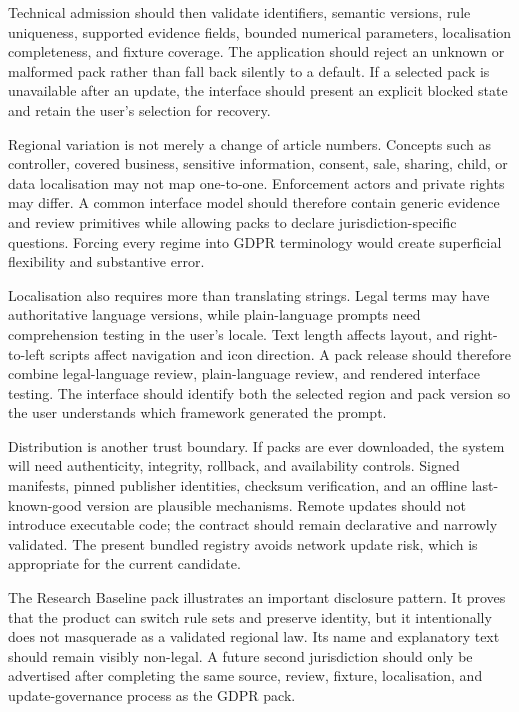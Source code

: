 Technical admission should then validate identifiers, semantic versions, rule uniqueness, supported evidence fields, bounded numerical parameters, localisation completeness, and fixture coverage. The application should reject an unknown or malformed pack rather than fall back silently to a default. If a selected pack is unavailable after an update, the interface should present an explicit blocked state and retain the user's selection for recovery.

Regional variation is not merely a change of article numbers. Concepts such as controller, covered business, sensitive information, consent, sale, sharing, child, or data localisation may not map one-to-one. Enforcement actors and private rights may differ. A common interface model should therefore contain generic evidence and review primitives while allowing packs to declare jurisdiction-specific questions. Forcing every regime into GDPR terminology would create superficial flexibility and substantive error.

Localisation also requires more than translating strings. Legal terms may have authoritative language versions, while plain-language prompts need comprehension testing in the user's locale. Text length affects layout, and right-to-left scripts affect navigation and icon direction. A pack release should therefore combine legal-language review, plain-language review, and rendered interface testing. The interface should identify both the selected region and pack version so the user understands which framework generated the prompt.

Distribution is another trust boundary. If packs are ever downloaded, the system will need authenticity, integrity, rollback, and availability controls. Signed manifests, pinned publisher identities, checksum verification, and an offline last-known-good version are plausible mechanisms. Remote updates should not introduce executable code; the contract should remain declarative and narrowly validated. The present bundled registry avoids network update risk, which is appropriate for the current candidate.

The Research Baseline pack illustrates an important disclosure pattern. It proves that the product can switch rule sets and preserve identity, but it intentionally does not masquerade as a validated regional law. Its name and explanatory text should remain visibly non-legal. A future second jurisdiction should only be advertised after completing the same source, review, fixture, localisation, and update-governance process as the GDPR pack.

